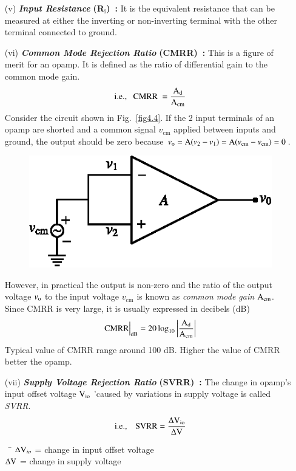 \begin{itemize}
\item[(v)] {\it\bfseries Input Resistance} {\bf (R$_{\text{i}}$)~:} It is the equivalent resistance that can be measured at either the inverting or non-inverting terminal with the other terminal connected to ground.

\item[(vi)] {\it\bfseries Common Mode Rejection Ratio} {\bf (CMRR)~:} This is a figure of merit for an opamp. It is defined as the ratio of differential gain to the common mode gain.
\begin{equation}
\text{i.e.,~~ CMRR~} = \frac{\textrm{A}_{\text{d}}}{\textrm{A}_{\text{cm}}}\label{eq4.4}
\end{equation}
Consider the circuit shown in Fig.~\ref{fig4.4}. If the 2 input terminals of an opamp are shorted and a common signal $v_{\text{cm}}$ applied between inputs and ground, the output should be zero because $v_{\textrm{o}}=\textrm{A} (v_{2}-v_{1})=\textrm{A} (v_{\text{cm}}-v_{\text{cm}})=0$.
\begin{figure}[H]
\centering
\includegraphics{chap4/fig4.5.eps}
\caption{}\label{fig4.5}
\end{figure}
However, in practical the output is non-zero and the ratio of the output voltage $v_{\textrm{o}}$ to the input voltage $v_{\text{cm}}$ is known as {\em common mode gain} $\textrm{A}_{\text{cm}}$. Since CMRR is very large, it is usually expressed in decibels (dB)
\begin{equation}
\text{CMRR} \Big|_{\text{dB}}= 20\log_{10}\left|\frac{\textrm{A}_{\text{d}}}{\textrm{A}_{\text{cm}}}\right|\label{eq4.5}
\end{equation}
Typical value of CMRR range around 100 dB. Higher the value of CMRR better the opamp.

\item[(vii)] {\it\bfseries Supply Voltage Rejection Ratio} {\bf (SVRR)~:} The change in opamp's input offset voltage $\textrm{V}_{\text{io}}$ 'caused by variations in supply voltage is called {\em SVRR}.
\begin{equation}
\text{i.e.,~~~ SVRR} =\frac{\Delta \textrm{V}_{\text{io}}}{\Delta \textrm{V}}\label{eq4.6}
\end{equation}
\begin{tabbing}
~ \= $\Delta \textrm{V}_{io}$ = change in input offset voltage\\[3pt]
                   \> $\Delta \textrm{V}$ = change in supply voltage
\end{tabbing}


\end{itemize}
